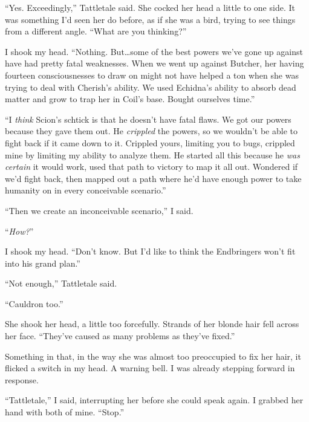 ``Yes.  Exceedingly,'' Tattletale said.  She cocked her head a little to one side.  It was something I'd seen her do before, as if she was a bird, trying to see things from a different angle.  ``What are you thinking?''



I shook my head.  ``Nothing.  But\ldots some of the best powers we've gone up against have had pretty fatal weaknesses.  When we went up against Butcher, her having fourteen consciousnesses to draw on might not have helped a ton when she was trying to deal with Cherish's ability.  We used Echidna's ability to absorb dead matter and grow to trap her in Coil's base.  Bought ourselves time.''



``I \emph{think} Scion's schtick is that he doesn't have fatal flaws.  We got our powers because they gave them out.  He \emph{crippled} the powers, so we wouldn't be able to fight back if it came down to it.  Crippled yours, limiting you to bugs, crippled mine by limiting my ability to analyze them.  He started all this because he \emph{was certain} it would work, used that path to victory to map it all out.  Wondered if we'd fight back, then mapped out a path where he'd have enough power to take humanity on in every conceivable scenario.''



``Then we create an inconceivable scenario,'' I said.



``\emph{How?}''



I shook my head.  ``Don't know.  But I'd like to think the Endbringers won't fit into his grand plan.''



``Not enough,'' Tattletale said.



``Cauldron too.''



She shook her head, a little too forcefully.  Strands of her blonde hair fell across her face.  ``They've caused as many problems as they've fixed.''



Something in that, in the way she was almost too preoccupied to fix her hair, it flicked a switch in my head.  A warning bell.  I was already stepping forward in response.



``Tattletale,'' I said, interrupting her before she could speak again.  I grabbed her hand with both of mine.  ``Stop.''



